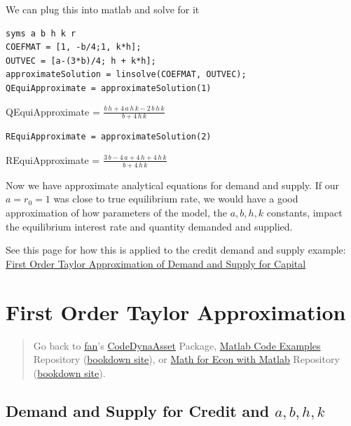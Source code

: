 \documentclass[
]{book}
\begin{document}
We can plug this into matlab and solve for it

\begin{verbatim}
syms a b h k r
COEFMAT = [1, -b/4;1, k*h];
OUTVEC = [a-(3*b)/4; h + k*h];
approximateSolution = linsolve(COEFMAT, OUTVEC);
QEquiApproximate = approximateSolution(1)
\end{verbatim}

QEquiApproximate =
\(\displaystyle \frac{b\,h+4\,a\,h\,k-2\,b\,h\,k}{b+4\,h\,k}\)

\begin{verbatim}
REquiApproximate = approximateSolution(2)
\end{verbatim}

REquiApproximate =
\(\displaystyle \frac{3\,b-4\,a+4\,h+4\,h\,k}{b+4\,h\,k}\)

Now we have approximate analytical equations for demand and supply. If
our \(a=r_0 =1\) was close to true equilibrium rate, we would have a good
approximation of how parameters of the model, the \(a,b,h,k\) constants,
impact the equilibrium interest rate and quantity demanded and supplied.

See this page for how this is applied to the credit demand and supply
example: \href{https://fanwangecon.github.io/Math4Econ/matrix_application/demand_supply_taylor_approximate_capital.html}{First Order Taylor Approximation of Demand and Supply for
Capital}

\hypertarget{first-order-taylor-approximation-1}{%
\section{First Order Taylor Approximation}\label{first-order-taylor-approximation-1}}

\begin{quote}
Go back to \href{http://fanwangecon.github.io/}{fan}'s \href{https://fanwangecon.github.io/CodeDynaAsset/}{CodeDynaAsset} Package, \href{https://fanwangecon.github.io/M4Econ/}{Matlab Code Examples} Repository (\href{https://fanwangecon.github.io/M4Econ/bookdown}{bookdown site}), or \href{https://fanwangecon.github.io/Math4Econ/}{Math for Econ with Matlab} Repository (\href{https://fanwangecon.github.io/Math4Econ/bookdown}{bookdown site}).
\end{quote}

\hypertarget{demand-and-supply-for-credit-and-abhk}{%
\subsection{\texorpdfstring{Demand and Supply for Credit and \(a,b,h,k\)}{Demand and Supply for Credit and a,b,h,k}}\label{demand-and-supply-for-credit-and-abhk}}
\end{document}
